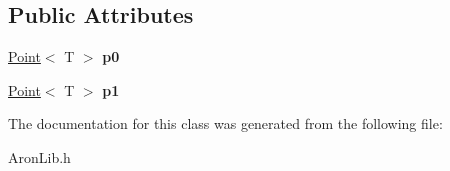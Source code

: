 \subsection*{Public Attributes}
\begin{DoxyCompactItemize}
\item 
\mbox{\label{class_aron_geometry_1_1_segment_a0339fdcab581818eca4c6319619026fa}} 
\mbox{\hyperlink{class_aron_geometry_1_1_point}{Point}}$<$ T $>$ {\bfseries p0}
\item 
\mbox{\label{class_aron_geometry_1_1_segment_ae38bb4aa1fca8e6ca664017c1dfd60bf}} 
\mbox{\hyperlink{class_aron_geometry_1_1_point}{Point}}$<$ T $>$ {\bfseries p1}
\end{DoxyCompactItemize}


The documentation for this class was generated from the following file\+:\begin{DoxyCompactItemize}
\item 
Aron\+Lib.\+h\end{DoxyCompactItemize}

